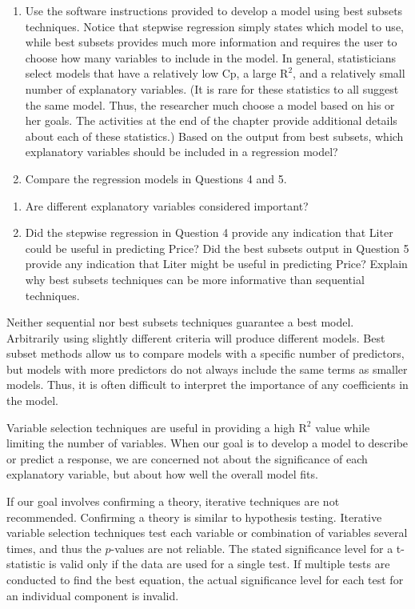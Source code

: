 \documentclass[
]{book}
\begin{document}
\begin{enumerate}
\def\labelenumi{\arabic{enumi}.}
\setcounter{enumi}{4}
\item
  Use the software instructions provided to develop a model using best subsets techniques. Notice that stepwise regression simply states which model to use, while best subsets provides much more information and requires the user to choose how many variables to include in the model. In general, statisticians select models that have a relatively low Cp, a large \(\mathrm{R}^2\), and a relatively small number of explanatory variables. (It is rare for these statistics to all suggest the same model. Thus, the researcher much choose a model based on his or her goals. The activities at the end of the chapter provide additional details about each of these statistics.) Based on the output from best subsets, which explanatory variables should be included in a regression model?
\item
  Compare the regression models in Questions 4 and 5.
\end{enumerate}

\begin{enumerate}
\def\labelenumi{\alph{enumi}.}
\item
  Are different explanatory variables considered important?
\item
  Did the stepwise regression in Question 4 provide any indication that Liter could be useful in predicting Price? Did the best subsets output in Question 5 provide any indication that Liter might be useful in predicting Price? Explain why best subsets techniques can be more informative than sequential techniques.
\end{enumerate}

Neither sequential nor best subsets techniques guarantee a best model. Arbitrarily using slightly different criteria will produce different models. Best subset methods allow us to compare models with a specific number of predictors, but models with more predictors do not always include the same terms as smaller models. Thus, it is often difficult to interpret the importance of any coefficients in the model.

Variable selection techniques are useful in providing a high \(\mathrm{R}^2\) value while limiting the number of variables. When our goal is to develop a model to describe or predict a response, we are concerned not about the significance of each explanatory variable, but about how well the overall model fits.

If our goal involves confirming a theory, iterative techniques are not recommended. Confirming a theory is similar to hypothesis testing. Iterative variable selection techniques test each variable or combination of variables several times, and thus the \(p\)-values are not reliable. The stated significance level for a t-statistic is valid only if the data are used for a single test. If multiple tests are conducted to find the best equation, the actual significance level for each test for an individual component is invalid.
\end{document}
